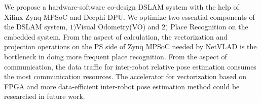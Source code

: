 \label{sec:conclusion} 

We propose a hardware-software co-design DSLAM system with the help of Xilinx Zynq MPSoC and Deephi DPU. We optimize two essential components of the DSLAM system,  $1)$Visual Odometry(VO) and $2)$ Place Recognition on the embedded system. From the aspect of calculation, the vectorization and projection operations on the PS side of Zynq MPSoC needed by NetVLAD is the bottleneck in doing more frequent place recognition. From the aspect of communication, the data traffic for inter-robot relative pose estimation consumes the most communication resources. The accelerator for vectorization based on FPGA and more data-efficient inter-robot pose estimation method could be researched in future work.